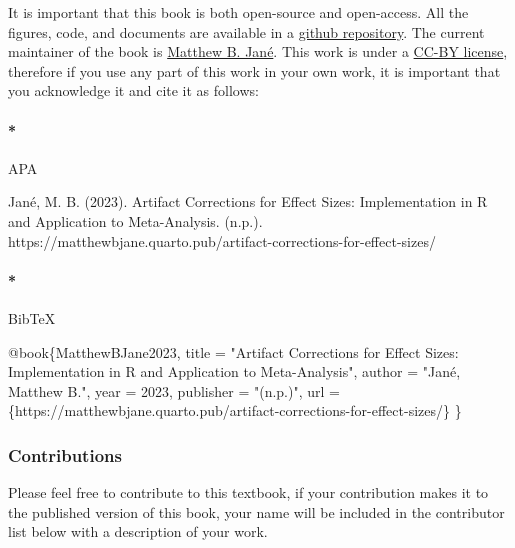 \documentclass[
  letterpaper,
  DIV=11,
  numbers=noendperiod]{scrreprt}
\let\oldparagraph\paragraph
\renewcommand{\paragraph}[1]{\oldparagraph{#1}\mbox{}}
\newenvironment{Shaded}{}{}
\newcommand{\NormalTok}[1]{\textcolor[rgb]{0.12,0.11,0.11}{#1}}
\begin{document}
It is important that this book is both open-source and open-access. All
the figures, code, and documents are available in a
\href{https://github.com/MatthewBJane/artifact-corrections-for-effect-sizes/}{github
repository}. The current maintainer of the book is
\href{https://matthewbjane.com}{Matthew B. Jané}. This work is under a
\href{LICENSE}{CC-BY license}, therefore if you use any part of this
work in your own work, it is important that you acknowledge it and cite
it as follows:

\hypertarget{apa}{%
\paragraph*{APA}\label{apa}}

Jané, M. B. (2023). Artifact Corrections for Effect Sizes:
Implementation in R and Application to Meta-Analysis. (n.p.).
https://matthewbjane.quarto.pub/artifact-corrections-for-effect-sizes/

\hypertarget{bibtex}{%
\paragraph*{BibTeX}\label{bibtex}}

\begin{Shaded}
\begin{Highlighting}[]
\NormalTok{@book\{MatthewBJane2023,}
\NormalTok{  title     = "Artifact Corrections for Effect Sizes: Implementation in R and Application to Meta{-}Analysis",}
\NormalTok{  author    = "Jané, Matthew B.",}
\NormalTok{  year      = 2023,}
\NormalTok{  publisher = "(n.p.)",}
\NormalTok{  url      = \{https://matthewbjane.quarto.pub/artifact{-}corrections{-}for{-}effect{-}sizes/\}}
\NormalTok{\}}
\end{Highlighting}
\end{Shaded}

\hypertarget{contributions}{%
\subsubsection*{Contributions}\label{contributions}}

Please feel free to contribute to this textbook, if your contribution
makes it to the published version of this book, your name will be
included in the contributor list below with a description of your work.
\end{document}
